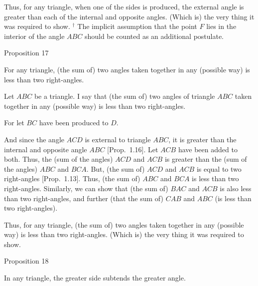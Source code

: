  \epsfysize=2.7in
\centerline{}
 
 Thus, for any triangle, when one of the sides is produced, the external angle
is greater than each of the internal and opposite angles. (Which is) the very thing
it was required to show.
{\footnotesize
\noindent $^\dag$  The implicit assumption that the point $F$ lies in the
 interior of the angle $ABC$ should be counted as an additional postulate.} 
 

\begin{center}
{\large Proposition 17}
\end{center}

For any triangle,  (the sum of) two angles taken together in any (possible way) is less than two right-angles.

\epsfysize=1.8in
\centerline{}

Let $ABC$ be a triangle. I say that (the sum of) two angles of triangle $ABC$
taken together in any (possible way) is less than two right-angles.

For let $BC$ have been produced to $D$.

And since the angle $ACD$ is external to triangle $ABC$, it is greater than the
internal and opposite angle $ABC$ [Prop.~1.16]. Let $ACB$ have been added to both. Thus, the
(sum of the angles) $ACD$ and $ACB$ is greater than the  (sum of the angles) $ABC$ and
$BCA$. But, (the sum of) $ACD$ and $ACB$ is equal to two right-angles [Prop.~1.13].
Thus, (the sum of) $ABC$ and $BCA$ is less than two right-angles. Similarly,
we can show that (the sum of) $BAC$ and $ACB$ is also less than two right-angles,
and further (that the sum of) $CAB$ and $ABC$ (is less than two right-angles).

Thus, for any triangle,  (the sum of) two angles taken together in any (possible way) is less than two right-angles. (Which is) the very thing
it was required to show.


\begin{center}
{\large Proposition 18}
\end{center}

In any triangle, the greater side subtends the greater angle.

\epsfysize=1.7in
\centerline{}

